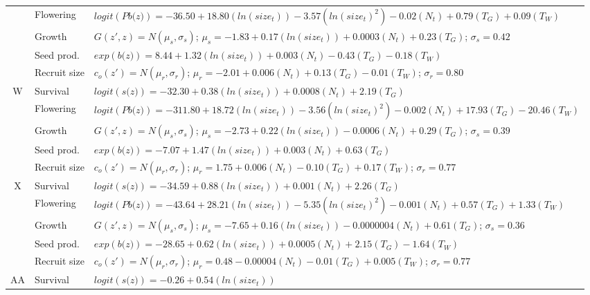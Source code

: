 \documentclass[12pt, letterpaper]{article}
\begin{document}
\begin{spacing}{1.3}
\begin{longtable}[ht!]{c|l|p{}}
         \rowcolor[gray]{.95}& Flowering  & $logit(\textit{Pb(z)})  = -36.50 + 18.80(ln(size_t)) -3.57(ln(size_t)^2)-0.02 (N_t) + 0.79 (T_G) +0.09 (T_W)$ \\
         & Growth  &  $G(z',z) = N(\mu_s, \sigma_s)$; $\mu_s = -1.83 + 0.17(ln(size_t)) + 0.0003 (N_t) + 0.23 (T_G)$; $\sigma_s = 0.42$\\
         \rowcolor[gray]{.95}& Seed prod.  & $exp(\textit{b(z)}) = 8.44 + 1.32(ln(size_t)) + 0.003 (N_t) -0.43 (T_G) - 0.18 (T_W)$  \\
         & Recruit size  &  $c_o(z') = N(\mu_r, \sigma_r)$; $\mu_r = -2.01 + 0.006 (N_t) + 0.13 (T_G) -0.01 (T_W) $; $\sigma_r = 0.80$ \\
         \hline
         \rowcolor[gray]{.95}W  &  Survival  &  $logit(\textit{s(z)})= -32.30 + 0.38(ln(size_t)) +0.0008(N_t) + 2.19(T_G)$ \\
         & Flowering  & $logit(\textit{Pb(z)})  = -311.80 + 18.72(ln(size_t)) -3.56(ln(size_t)^2)-0.002 (N_t) + 17.93 (T_G) -20.46 (T_W)$ \\
         \rowcolor[gray]{.95}& Growth  &  $G(z',z) = N(\mu_s, \sigma_s)$; $\mu_s = -2.73 + 0.22(ln(size_t)) -0.0006 (N_t) + 0.29 (T_G)$; $\sigma_s = 0.39$\\
         & Seed prod.  & $exp(\textit{b(z)}) = -7.07 + 1.47(ln(size_t)) + 0.003 (N_t) +0.63(T_G)$  \\
         \rowcolor[gray]{.95}& Recruit size  &  $c_o(z') = N(\mu_r, \sigma_r)$; $\mu_r = 1.75 + 0.006 (N_t) - 0.10 (T_G) + 0.17 (T_W) $; $\sigma_r = 0.77$ \\
         \hline
         X  &  Survival  &  $logit(\textit{s(z)})= -34.59 + 0.88(ln(size_t)) +0.001(N_t) + 2.26(T_G)$ \\
         \rowcolor[gray]{.95}& Flowering  & $logit(\textit{Pb(z)})  = -43.64 + 28.21(ln(size_t)) -5.35(ln(size_t)^2)-0.001 (N_t) + 0.57 (T_G) +1.33 (T_W)$ \\
         & Growth  &  $G(z',z) = N(\mu_s, \sigma_s)$; $\mu_s = -7.65 + 0.16(ln(size_t)) -0.0000004 (N_t) + 0.61 (T_G)$; $\sigma_s = 0.36$\\
         \rowcolor[gray]{.95}& Seed prod.  & $exp(\textit{b(z)}) = -28.65 + 0.62(ln(size_t)) + 0.0005 (N_t) +2.15(T_G) - 1.64 (T_W)$  \\
         & Recruit size  &  $c_o(z') = N(\mu_r, \sigma_r)$; $\mu_r = 0.48 - 0.00004 (N_t) - 0.01 (T_G) + 0.005 (T_W) $; $\sigma_r = 0.77$ \\
         \hline
         \rowcolor[gray]{.95}AA  &  Survival  &  $logit(\textit{s(z)})= -0.26 + 0.54(ln(size_t))$ \\

\end{longtable}
\end{spacing}
\end{document}
